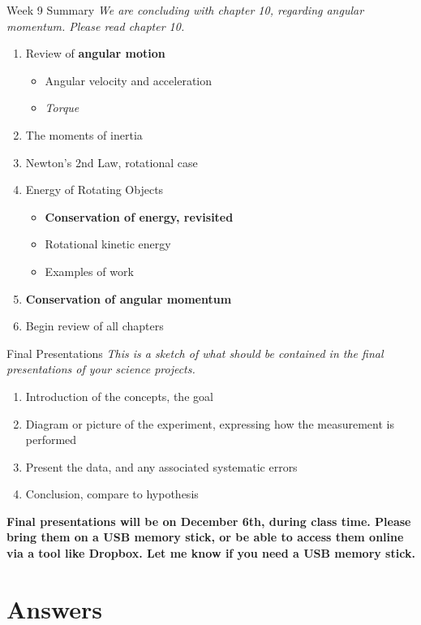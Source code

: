 \documentclass{beamer}
\begin{document}
\begin{frame}{Week 9 Summary}
\textit{We are concluding with chapter 10, regarding angular momentum. Please read chapter 10.}
\begin{enumerate}
\item Review of \textbf{angular motion}
\begin{itemize}
\item Angular velocity and acceleration
\item \textit{Torque}
\end{itemize}
\item \alert{The moments of inertia}
\item Newton's 2nd Law, rotational case
\item Energy of Rotating Objects
\begin{itemize}
\item \textbf{Conservation of energy, revisited}
\item Rotational kinetic energy
\item Examples of work
\end{itemize}
\item \textbf{\alert{Conservation of angular momentum}}
\item Begin review of all chapters
\end{enumerate}
\end{frame}

\begin{frame}{Final Presentations}
\textit{This is a sketch of what should be contained in the final presentations of your science projects.}
\begin{enumerate}
\item Introduction of the concepts, the goal
\item Diagram or picture of the experiment, expressing how the measurement is performed
\item Present the data, and any associated systematic errors
\item Conclusion, compare to hypothesis
\end{enumerate}
\textbf{Final presentations will be on December 6th, during class time.  Please bring them on a USB memory stick, or be able to access them online via a tool like Dropbox.  Let me know if you need a USB memory stick.}
\end{frame}

\section{Answers}
\end{document}

